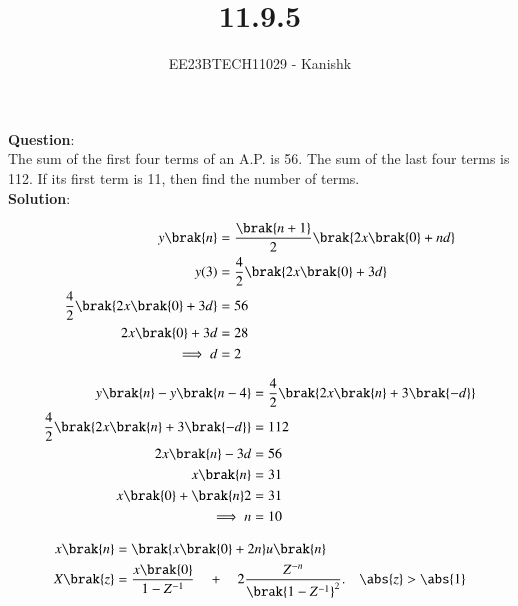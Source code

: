 \documentclass[journal,12pt,twocolumn]{IEEEtran}
\theoremstyle{remark}
\begin{document}

\vspace{3cm}

\title{11.9.5}
\author{EE23BTECH11029 - Kanishk}
\maketitle

\bigskip

\renewcommand{\thefigure}{\theenumi}
\renewcommand{\thetable}{\theenumi}
\textbf{Question}:\\ 
The sum of the first four terms of an A.P. is 56. The sum of the last four terms is
112. If its first term is 11, then find the number of terms.\\

\textbf{Solution}:\\ 

\begin{table}[ht]
    \centering
    \def\arraystretch{1.5}
    
    \label{}
\end{table}

\small
{}

\begin{align}
y\brak{n}&=\frac{\brak{n+1}}{2}\brak{2x\brak{0}+nd}\\
y(3)&=\frac{4}{2}\brak{2x\brak{0}+3d}\\
\frac{4}{2}\brak{2x\brak{0}+3d}&=56\\
2x\brak{0}+3d&=28\\
\implies d&=2
\end{align}

\begin{align}
y\brak{n}-y\brak{n-4}&=\frac{4}{2}\brak{2x\brak{n}+3\brak{-d}}\\
\frac{4}{2}\brak{2x\brak{n}+3\brak{-d}}&=112\\
2x\brak{n}-3d&=56\\
x\brak{n}&=31\\
x\brak{0}+\brak{n}2&=31\\
\implies n&=10
\end{align}


\begin{align}
x\brak{n}&=\brak{x\brak{0}+2n}u\brak{n}\\
X\brak{z}&=\frac{x\brak{0}}{1-Z^{-1}}\quad+\quad 2\frac{Z^{-n}}{\brak{1-Z^{-1}}^{2}}.\quad \abs{z} > \abs{1}
\end{align}

\newpage
\end{document}
